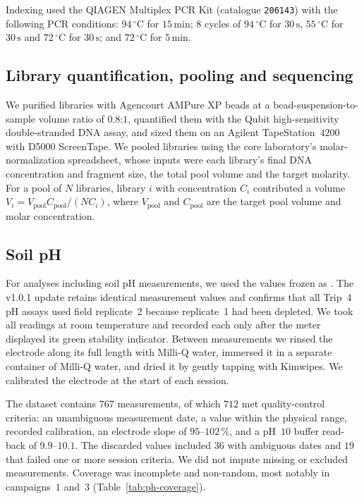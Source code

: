 \documentclass[11pt]{article}
\begin{document}
Indexing used the QIAGEN Multiplex PCR Kit (catalogue \texttt{206143}) with the following PCR conditions:
$94\,^{\circ}\mathrm{C}$ for $15\,\mathrm{min}$; $8$ cycles of
$94\,^{\circ}\mathrm{C}$ for $30\,\mathrm{s}$, $55\,^{\circ}\mathrm{C}$ for
$30\,\mathrm{s}$ and $72\,^{\circ}\mathrm{C}$ for $30\,\mathrm{s}$; and
$72\,^{\circ}\mathrm{C}$ for $5\,\mathrm{min}$.

\subsection{Library quantification, pooling and sequencing}
We purified libraries with Agencourt AMPure XP beads at a
bead-suspension-to-sample volume ratio of $0.8$:$1$, quantified them with the
Qubit high-sensitivity double-stranded DNA assay, and sized them on an Agilent
TapeStation~$4200$ with D5000 ScreenTape. We pooled libraries using the core
laboratory's molar-normalization spreadsheet, whose inputs were each library's
final DNA concentration and fragment size, the total pool volume and the target
molarity. For a pool of $N$ libraries, library $i$ with concentration $C_i$
contributed a volume $V_i = V_{\mathrm{pool}}C_{\mathrm{pool}}/(N C_i)$, where
$V_{\mathrm{pool}}$ and $C_{\mathrm{pool}}$ are the target pool volume and molar
concentration.

\subsection{Soil pH}
\label{sup:pH}

For analyses including soil pH measurements, we used the values frozen as \PHDatasetVersion. The v1.0.1 update retains identical measurement values and confirms that all Trip~4 pH assays used field replicate~2 because replicate~1 had been depleted. We took all readings
at room temperature and recorded each only after the meter displayed its green
stability indicator. Between measurements we rinsed the electrode along its full
length with Milli-Q water, immersed it in a separate container of Milli-Q water,
and dried it by gently tapping with Kimwipes. We calibrated the electrode at the
start of each session.

The dataset contains $767$ measurements, of which $712$ met quality-control criteria: an unambiguous measurement date, a value within the physical range, recorded calibration, an electrode slope of
$95$--$102\,\%$, and a pH~$10$ buffer read-back of $9.9$--$10.1$. The discarded values included $36$ with ambiguous dates and $19$ that failed one or more session
criteria. We did not impute missing or excluded measurements. Coverage was
incomplete and non-random, most notably in campaigns~$1$ and~$3$
(Table~\ref{tab:ph-coverage}).
\end{document}
